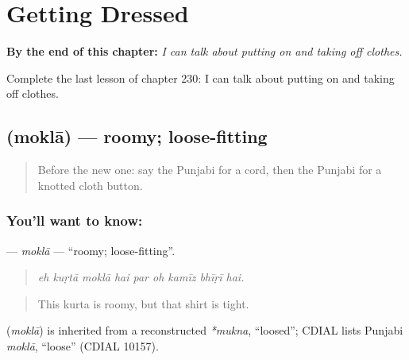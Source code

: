 
\chapter{Getting Dressed}
\label{ch:pa-a2-getting-dressed}

\begin{chapteropening}
\textbf{By the end of this chapter:} \emph{I can talk about putting on and taking off clothes.}

Complete the last lesson of chapter 230: I can talk about putting on and taking off clothes.
\end{chapteropening}

\section[\texorpdfstring{\pa{ਮੋਕਲਾ} (moklā)}{ਮੋਕਲਾ (moklā)}]{ (moklā) — roomy; loose-fitting}

\label{lesson:PA-C230-mokla}



\begin{quote}
Before the new one: say the Punjabi for a cord, then the Punjabi for a knotted cloth button.
\end{quote}

\subsection*{You'll want to know: }
\textbf{} — \emph{moklā} — \textquotedblleft{}roomy; loose-fitting\textquotedblright{}.

\begin{quote}
        
\end{quote}

\begin{quote}
\emph{eh kuṛtā moklā hai par oh kamīz bhīṛī hai.}
\end{quote}

\begin{quote}
This kurta is roomy, but that shirt is tight.
\end{quote}

\begin{cousinweb}
\textbf{} (\emph{moklā}) is inherited from a reconstructed \emph{*mukna}, \textquotedblleft{}loosed\textquotedblright{}; CDIAL lists Punjabi \emph{moklā}, \textquotedblleft{}loose\textquotedblright{} (CDIAL 10157).
\end{cousinweb}

